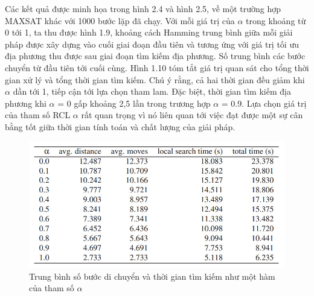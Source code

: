 \documentclass[14pt,a4paper]{report}
\begin{document}
Các kết quả được minh họa trong hình 2.4 và hình 2.5, về một trường hợp MAXSAT khác với 1000 bước lặp đã chạy. Với mỗi giá trị của $\alpha$ trong khoảng từ 0 tới 1, ta thu được hình 1.9, khoảng cách Hamming trung bình giữa mỗi giải pháp được xây dựng vào cuối giai đoạn đầu tiên và tương ứng với giá trị tối ưu địa phương thu được sau giai đoạn tìm kiếm địa phương. Số trung bình các bước chuyển từ đầu tiên tới cuối cùng. Hình 1.10 tóm tắt giá trị quan sát cho tổng thời gian xử lý và tổng thời gian tìm kiếm. Chú ý rằng, cả hai thời gian đều giảm khi $\alpha$ dần tới 1, tiếp cận tới lựa chọn tham lam. Đặc biệt, thời gian tìm kiếm địa phương khi $\alpha$ = 0 gấp khoảng 2,5 lần trong trương hợp $\alpha$ = 0.9. Lựa chọn giá trị của tham số RCL $\alpha$ rất quan trọng vì nó liên quan tới việc đạt được một sự cân bằng tốt giữa thời gian tính toán và chất lượng của giải pháp.

\begin{center}
	\begin{figure}[htp]
		\begin{center}
			\includegraphics[scale=.65]{images/hinh1_9}
		\end{center}
		\caption{Trung bình số bước di chuyển và thời gian tìm kiếm như một hàm của tham số $\alpha$}
		\label{refhinh4}
	\end{figure}
\end{center}
\end{document}
